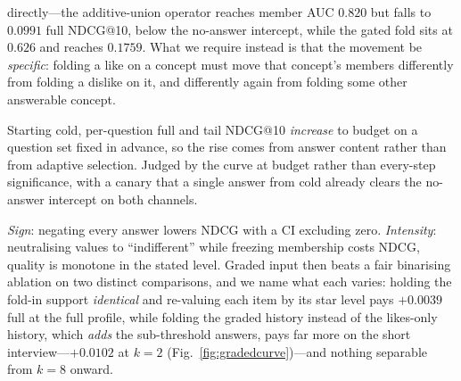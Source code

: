 \documentclass[11pt]{article}
\begin{document}
\begin{description}[leftmargin=2.4em,itemsep=1.5pt]
        directly---the additive-union operator reaches member AUC $0.820$ but falls to $0.0991$ full
        NDCG@10, below the no-answer intercept, while the gated fold sits at $0.626$ and reaches $0.1759$. What we
        require instead is that the movement be \emph{specific}: folding a like on a concept must move that
        concept's members differently from folding a dislike on it, and differently again from folding some other
        answerable concept.
  \item[R3 --- monotonicity.] Starting cold, per-question full and tail NDCG@10 \emph{increase} to budget on a
        question set fixed in advance, so the rise comes from answer content rather than from adaptive selection.
        Judged by the curve at budget rather than every-step significance, with a canary that a single answer from
        cold already clears the no-answer intercept on both channels.
  \item[R4 --- expressive answers.] \emph{Sign}: negating every answer lowers NDCG with a CI excluding zero.
        \emph{Intensity}: neutralising values to ``indifferent'' while freezing membership costs NDCG, quality is
        monotone in the stated level. Graded input then beats a fair binarising ablation on two distinct
        comparisons, and we name what each varies: holding the fold-in support \emph{identical} and
        re-valuing each item by its star level pays $+0.0039$ full at the full profile, while folding the
        graded history instead of the likes-only history, which \emph{adds} the sub-threshold answers, pays
        far more on the short interview---$+0.0102$ at $k{=}2$ (Fig.~\ref{fig:gradedcurve})---and nothing
        separable from $k{=}8$ onward.
\end{description}
\end{document}
